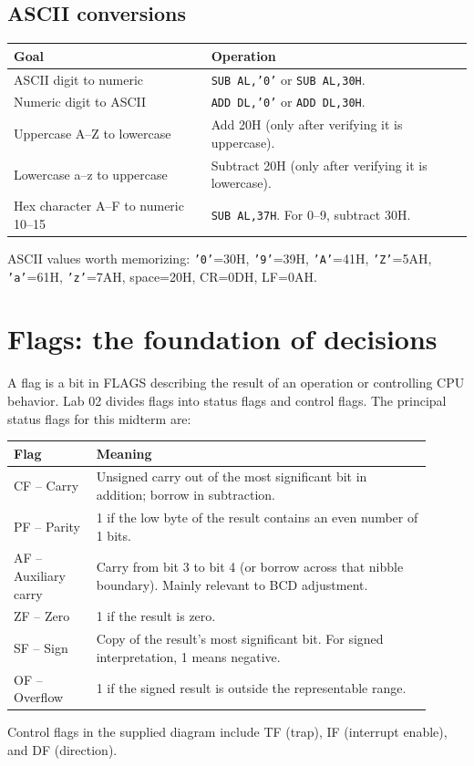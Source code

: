 \documentclass[11pt,a4paper]{article}
\begin{document}
\subsection{ASCII conversions}
\begin{tabularx}{\linewidth}{lX}
\toprule \textbf{Goal} & \textbf{Operation}\\
\midrule
ASCII digit to numeric & \texttt{SUB AL,'0'} or \texttt{SUB AL,30H}.\\
Numeric digit to ASCII & \texttt{ADD DL,'0'} or \texttt{ADD DL,30H}.\\
Uppercase A--Z to lowercase & Add 20H (only after verifying it is uppercase).\\
Lowercase a--z to uppercase & Subtract 20H (only after verifying it is lowercase).\\
Hex character A--F to numeric 10--15 & \texttt{SUB AL,37H}. For 0--9, subtract 30H.\\
\bottomrule
\end{tabularx}
ASCII values worth memorizing: \texttt{'0'}=30H, \texttt{'9'}=39H, \texttt{'A'}=41H, \texttt{'Z'}=5AH, \texttt{'a'}=61H, \texttt{'z'}=7AH, space=20H, CR=0DH, LF=0AH.

\section{Flags: the foundation of decisions}
A flag is a bit in FLAGS describing the result of an operation or controlling CPU behavior. Lab 02 divides flags into status flags and control flags. The principal status flags for this midterm are:
\begin{longtable}{p{0.18\linewidth}p{0.73\linewidth}}
\toprule \textbf{Flag} & \textbf{Meaning}\\
\midrule
CF -- Carry & Unsigned carry out of the most significant bit in addition; borrow in subtraction.\\
PF -- Parity & 1 if the low byte of the result contains an even number of 1 bits.\\
AF -- Auxiliary carry & Carry from bit 3 to bit 4 (or borrow across that nibble boundary). Mainly relevant to BCD adjustment.\\
ZF -- Zero & 1 if the result is zero.\\
SF -- Sign & Copy of the result's most significant bit. For signed interpretation, 1 means negative.\\
OF -- Overflow & 1 if the signed result is outside the representable range.\\
\bottomrule
\end{longtable}
Control flags in the supplied diagram include TF (trap), IF (interrupt enable), and DF (direction).
\end{document}
